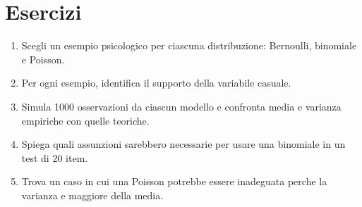 \documentclass[
  italian,
  letterpaper,
  a4paper,
  11pt,
  open=any]{scrbook}
\providecommand{\tightlist}{%
  \setlength{\itemsep}{0pt}\setlength{\parskip}{0pt}}
\theoremstyle{plain}
\theoremstyle{definition}
\theoremstyle{definition}
\theoremstyle{remark}
\begin{document}
\section*{Esercizi}\label{esercizi-2}


\begin{tcolorbox}[enhanced jigsaw, arc=.35mm, bottomrule=.15mm, bottomtitle=1mm, breakable, colback=white, colbacktitle=quarto-callout-important-color!10!white, colframe=quarto-callout-important-color-frame, coltitle=black, left=2mm, leftrule=.75mm, opacityback=0, opacitybacktitle=0.6, rightrule=.15mm, title=\textcolor{quarto-callout-important-color}{\faExclamation}\hspace{0.5em}{Esercizi di base}, titlerule=0mm, toprule=.15mm, toptitle=1mm]

\begin{enumerate}
\def\labelenumi{\arabic{enumi}.}
\tightlist
\item
  Scegli un esempio psicologico per ciascuna distribuzione: Bernoulli,
  binomiale e Poisson.
\item
  Per ogni esempio, identifica il supporto della variabile casuale.
\item
  Simula 1000 osservazioni da ciascun modello e confronta media e
  varianza empiriche con quelle teoriche.
\item
  Spiega quali assunzioni sarebbero necessarie per usare una binomiale
  in un test di 20 item.
\item
  Trova un caso in cui una Poisson potrebbe essere inadeguata perche la
  varianza e maggiore della media.
\end{enumerate}

\end{tcolorbox}
\end{document}
